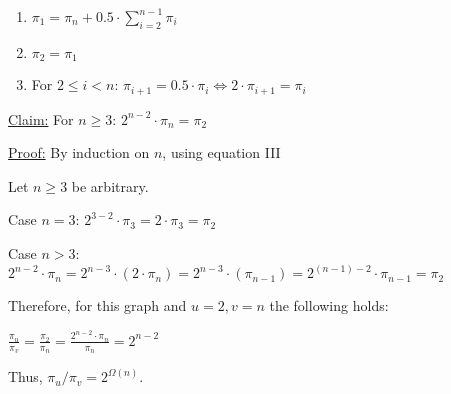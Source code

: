 \begin{enumerate}[I:]
    \item $\pi_1 = \pi_n + 0.5 \cdot \sum\limits_{i = 2}^{n - 1} \pi_i$
    \item $\pi_2 = \pi_1$
    \item For $2 \leq i < n$: $\pi_{i + 1} = 0.5 \cdot \pi_i \Leftrightarrow 2 \cdot \pi_{i + 1} = \pi_{i}$ 
\end{enumerate}

\underline{Claim:} For $n \geq 3$: $2^{n-2}\cdot\pi_n = \pi_2$ 

\underline{Proof:} By induction on $n$, using equation III

Let $n \geq 3$ be arbitrary.

Case $n = 3$: $2^{3-2}\cdot\pi_3 = 2\cdot\pi_3 = \pi_2$

Case $n > 3$: $2^{n-2}\cdot\pi_n = 2^{n-3}\cdot(2 \cdot \pi_n) = 2^{n-3}\cdot(\pi_{n - 1}) = 2^{(n-1)-2}\cdot\pi_{n - 1} = \pi_2$

Therefore, for this graph and $u = 2, v = n$ the following holds:

$\frac{\pi_u}{\pi_v} = \frac{\pi_2}{\pi_n} = \frac{2^{n - 2} \cdot \pi_n}{\pi_n} = 2^{n - 2}$

Thus, $\pi_u/\pi_v = 2^{\Omega(n)}$.